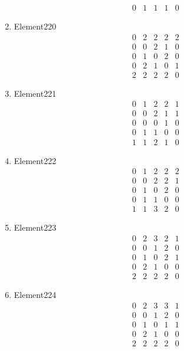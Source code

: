 \documentclass[12pt]{article}
\begin{document}
\begin{multicols}{3}
\begin{enumerate}
\begin{equation*}
\begin{array}{ccccc}
0&1&1&1&0
\end{array}
\end{equation*}
\item Element220
\begin{equation*}
\begin{array}{ccccc}
0&2&2&2&2\\
0&0&2&1&0\\
0&1&0&2&0\\
0&2&1&0&1\\
2&2&2&2&0
\end{array}
\end{equation*}
\item Element221
\begin{equation*}
\begin{array}{ccccc}
0&1&2&2&1\\
0&0&2&1&1\\
0&0&0&1&0\\
0&1&1&0&0\\
1&1&2&1&0
\end{array}
\end{equation*}
\item Element222
\begin{equation*}
\begin{array}{ccccc}
0&1&2&2&2\\
0&0&2&2&1\\
0&1&0&2&0\\
0&1&1&0&0\\
1&1&3&2&0
\end{array}
\end{equation*}
\item Element223
\begin{equation*}
\begin{array}{ccccc}
0&2&3&2&1\\
0&0&1&2&0\\
0&1&0&2&1\\
0&2&1&0&0\\
2&2&2&2&0
\end{array}
\end{equation*}
\item Element224
\begin{equation*}
\begin{array}{ccccc}
0&2&3&3&1\\
0&0&1&2&0\\
0&1&0&1&1\\
0&2&1&0&0\\
2&2&2&2&0
\end{array}
\end{equation*}

\end{enumerate}
\end{multicols}
\end{document}
